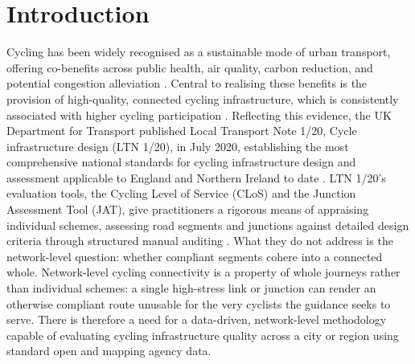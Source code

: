 \chapter{Introduction}
\label{ch:introduction}

Cycling has been widely recognised as a sustainable mode of urban transport, offering co-benefits across public health, air quality, carbon reduction, and potential congestion alleviation \parencite{who2022,ipcc2023,eu2024}. Central to realising these benefits is the provision of high-quality, connected cycling infrastructure, which is consistently associated with higher cycling participation \parencite{hull2014,pistoll2014,buehler2016,molenberg2019}. Reflecting this evidence, the UK Department for Transport published Local Transport Note 1/20, Cycle infrastructure design (LTN 1/20), in July 2020, establishing the most comprehensive national standards for cycling infrastructure design and assessment applicable to England and Northern Ireland to date \parencite{departmentfortransport2020a}. LTN 1/20's evaluation tools, the Cycling Level of Service (CLoS) and the Junction Assessment Tool (JAT), give practitioners a rigorous means of appraising individual schemes, assessing road segments and junctions against detailed design criteria through structured manual auditing \parencite{departmentfortransport2020a}. What they do not address is the network-level question: whether compliant segments cohere into a connected whole. Network-level cycling connectivity is a property of whole journeys rather than individual schemes: a single high-stress link or junction can render an otherwise compliant route unusable for the very cyclists the guidance seeks to serve. There is therefore a need for a data-driven, network-level methodology capable of evaluating cycling infrastructure quality across a city or region using standard open and mapping agency data.

